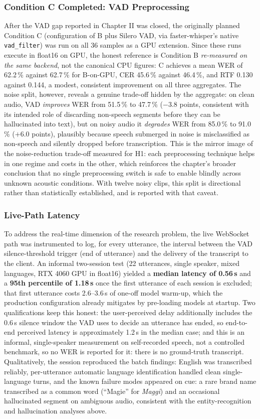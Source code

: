 \documentclass[12pt]{report}
\begin{document}
\subsubsection{Condition C Completed: VAD Preprocessing}
After the VAD gap reported in Chapter II was closed, the originally planned Condition C (configuration of B plus Silero VAD, via faster-whisper's native \texttt{vad\_filter}) was run on all 36 samples as a GPU extension. Since these runs execute in float16 on GPU, the honest reference is Condition B \emph{re-measured on the same backend}, not the canonical CPU figures: C achieves a mean WER of 62.2\,\% against 62.7\,\% for B-on-GPU, CER 45.6\,\% against 46.4\,\%, and RTF 0.130 against 0.144, a modest, consistent improvement on all three aggregates. The noise split, however, reveals a genuine trade-off hidden by the aggregate: on clean audio, VAD \emph{improves} WER from 51.5\,\% to 47.7\,\% ($-3.8$ points, consistent with its intended role of discarding non-speech segments before they can be hallucinated into text), but on noisy audio it \emph{degrades} WER from 85.0\,\% to 91.0\,\% ($+6.0$ points), plausibly because speech submerged in noise is misclassified as non-speech and silently dropped before transcription. This is the mirror image of the noise-reduction trade-off measured for H1: each preprocessing technique helps in one regime and costs in the other, which reinforces the chapter's broader conclusion that no single preprocessing switch is safe to enable blindly across unknown acoustic conditions. With twelve noisy clips, this split is directional rather than statistically established, and is reported with that caveat.
\subsubsection{Live-Path Latency}
To address the real-time dimension of the research problem, the live WebSocket path was instrumented to log, for every utterance, the interval between the VAD silence-threshold trigger (end of utterance) and the delivery of the transcript to the client. An informal two-session test (22 utterances, single speaker, mixed languages, RTX 4060 GPU in float16) yielded a \textbf{median latency of 0.56\,s} and a \textbf{95th percentile of 1.18\,s} once the first utterance of each session is excluded; that first utterance costs 2.6--3.6\,s of one-off model warm-up, which the production configuration already mitigates by pre-loading models at startup. Two qualifications keep this honest: the user-perceived delay additionally includes the 0.6\,s silence window the VAD uses to decide an utterance has ended, so end-to-end perceived latency is approximately 1.2\,s in the median case; and this is an informal, single-speaker measurement on self-recorded speech, not a controlled benchmark, so no WER is reported for it: there is no ground-truth transcript. Qualitatively, the session reproduced the batch findings: English was transcribed reliably, per-utterance automatic language identification handled clean single-language turns, and the known failure modes appeared on cue: a rare brand name transcribed as a common word (\enquote{Magie} for \emph{Maggi}) and an occasional hallucinated segment on ambiguous audio, consistent with the entity-recognition and hallucination analyses above.
\end{document}
